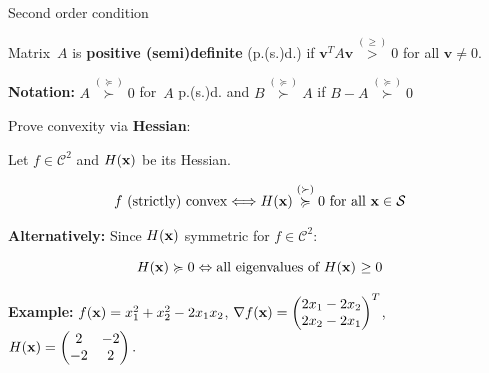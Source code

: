 \documentclass[11pt,compress,t,notes=noshow, xcolor=table]{beamer}
\begin{document}
\begin{vbframe}{Second order condition}

Matrix~$A$ is \textbf{positive (semi)definite} (p.(s.)d.) if $\bm{v}^T A \bm{v} \overset{(\geq)}{>} 0$ for all $\bm{v}\not=0.$

\medskip

\textbf{Notation:} $A \overset{(\succcurlyeq)}{\succ} 0$ for~$A$ p.(s.)d. and $B \overset{(\succcurlyeq)}{\succ} A$ if $B-A \overset{(\succcurlyeq)}{\succ} 0$

\lz

Prove convexity via \textbf{Hessian}:


    Let $f \in \mathcal{C}^2$ and $H(\mathbf{x})$ be its Hessian.

    \vspace{-\baselineskip}

    \begin{gather*}
        \textnormal{$f$ (strictly) convex} \Longleftrightarrow H(\mathbf{x}) \overset{(\succ)}{\succcurlyeq} 0 \textnormal{ for all $\mathbf{x} \in \mathcal{S}$}
    \end{gather*}


\textbf{Alternatively:} Since $H(\mathbf{x})$ symmetric for $f \in \mathcal{C}^2$:

\vspace{-0.5\baselineskip}

\begin{equation*}
    H(\mathbf{x}) \succcurlyeq 0 \Leftrightarrow \textnormal{all eigenvalues of $H(\mathbf{x})$ $\ge 0$}
\end{equation*}

\framebreak



\begin{footnotesize}
\textbf{Example:} $f(\mathbf{x}) = x_1^2 + x_2^2 - 2x_1x_2$, $\nabla f(\mathbf{x}) = \begin{pmatrix}2x_1 - 2x_2 \\ 2x_2 - 2x_1\end{pmatrix}^T$, $H(\mathbf{x}) = \begin{pmatrix} 2 & -2 \\ -2 & 2 \end{pmatrix}.
$


\end{footnotesize}
\end{vbframe}
\end{document}
